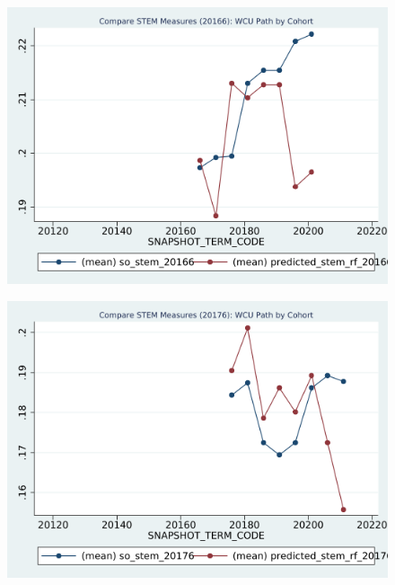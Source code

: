 \begin{figure}[h!]
\begin{centering}
\includegraphics[scale=1]{"figures/WCU_20166_COMPARE_path_by_cohort_CAREER_STEM"}
\end{centering}
\end{figure}
\newpage
\begin{figure}[h!]
\begin{centering}
\includegraphics[scale=1]{"figures/WCU_20176_COMPARE_path_by_cohort_CAREER_STEM"}
\end{centering}
\end{figure}
\newpage
